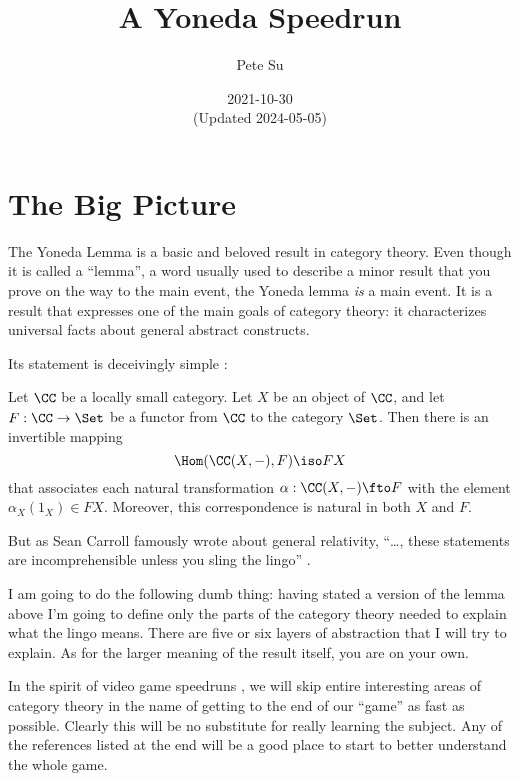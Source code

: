 
\usepackage{microtype}
\usepackage{datetime2}



\title{\Large A Yoneda Speedrun}
\author{\large Pete Su}
\date{\normalsize 2021-10-30 \\ {\footnotesize (Updated 2024-05-05)}}

\maketitle

\section{The Big Picture}

The Yoneda Lemma is a basic and beloved result in category theory. Even though it is
called a ``lemma'', a word usually used to describe a minor result that you prove on the
way to the main event, the Yoneda lemma {\it is} a main event. It is a result that
expresses one of the main goals of category theory: it characterizes universal facts about
general abstract constructs.

Its statement is deceivingly simple \cite{Riehl2016}:

\pg
Let $\CC$ be a locally small category. Let $X$ be an object of $\CC$, and let $F: \CC \to
\Set$ be a functor from $\CC$ to the category $\Set$. Then there is an invertible mapping
$$
\Hom(\CC(X, -),F) \iso FX
$$
that associates each natural transformation $\alpha:\CC(X,-) \fto F$ with the element
$\alpha_X(1_X) \in FX$. Moreover, this correspondence is natural in both $X$ and $F$.

\pg
But as Sean Carroll famously wrote about general relativity, ``\dots, these statements are
incomprehensible unless you sling the lingo'' \cite{carroll}.

I am going to do the following dumb thing: having stated a version of the lemma above I'm
going to define only the parts of the category theory needed to explain what the lingo
means. There are five or six layers of abstraction that I will 
try to explain. As for the larger meaning of the result itself, you are on your own. 

In the spirit of video game speedruns \cite{lobos}, we will skip entire interesting areas
of category theory in the name of getting to the end of our ``game'' as fast
as possible. Clearly this will be no substitute for really learning the subject. Any of
the references listed at the end will be a good place to start to better understand the
whole game.

